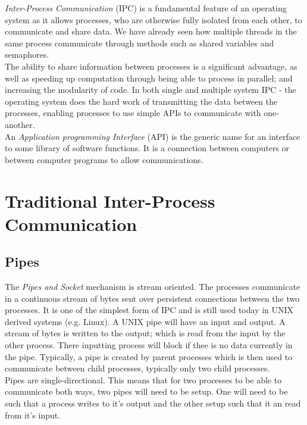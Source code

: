 
\textit{Inter-Process Communication} (IPC) is a fundamental feature of an operating system as it allows processes, who are otherwise fully isolated from each other, to communicate and share data. We have already seen how multiple threads in the same process communicate through methods such as shared variables and semaphores.\\

The ability to share information between processes is a significant advantage, as well as speeding up computation through being able to process in parallel; and increasing the modularity of code. In both single and multiple system IPC - the operating system does the hard work of transmitting the data between the processes, enabling processes to use simple APIs to communicate with one-another.\\

An \textit{Application programming Interface} (API) is the generic name for an interface to some library of software functions. It is a connection between computers or between computer programs to allow communications.

\section{Traditional Inter-Process Communication}
\subsection{Pipes}
The \textit{Pipes and Socket} mechanism is stream oriented. The processes communicate in a continuous stream of bytes sent over persistent connections between the two processes. It is one of the simplest form of IPC and is still used today in UNIX derived systems (e.g. Linux). A UNIX pipe will have an input and output. A stream of bytes is written to the output; which is read from the input by the other process. There inputting process will block if thee is no data currently in the pipe. Typically, a pipe is created by parent processes which is then used to communicate between child processes, typically only two child processes.\\

Pipes are single-directional. This means that for two processes to be able to communicate both ways, two pipes will need to be setup. One will need to be such that a process writes to it's output and the other setup such that it an read from it's input.\\

